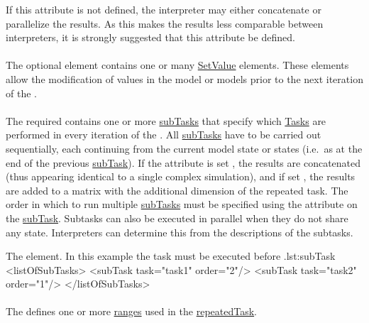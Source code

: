 If this attribute is not defined, the interpreter may either concatenate or parallelize the results.  As this makes the results less comparable between interpreters, it is strongly suggested that this attribute be defined.

\paragraph*{}
\label{sec:changesRepeatedTask}
The optional  element contains one or many \hyperref[class:setValue]{SetValue} elements. These elements allow the modification of values in the model or models prior to the next iteration of the \RepeatedTask.

\paragraph*{}
\label{class:listOfSubTasks}
The required  contains one or more \hyperref[class:subTask]{subTasks} that specify which \hyperref[class:abstractTask]{Tasks} are performed in every iteration of the \RepeatedTask. All \hyperref[class:subTask]{subTasks} have to be carried out sequentially, each continuing from the current model state or states (i.e.\ as at the end of the previous \hyperref[class:subTask]{subTask}).  If the  attribute is set , the results are concatenated (thus appearing identical to a single complex simulation), and if set , the results are added to a matrix with the additional dimension of the repeated task. The order in which to run multiple \hyperref[class:subTask]{subTasks} must be specified using the \hyperref[sec:subTaskOrder]{} attribute on the \hyperref[class:subTask]{subTask}.  Subtasks can also be executed in parallel when they do not share any state. Interpreters can determine this from the descriptions of the subtasks.

\begin{myXmlLst}{The  element. In this example the task  must be executed before .}{lst:subTask}
<listOfSubTasks>
	<subTask task="task1" order="2"/> 
	<subTask task="task2" order="1"/> 
</listOfSubTasks>
\end{myXmlLst}

\paragraph*{}
\label{class:listOfRanges}
The  defines one or more \hyperref[class:range]{ranges} used in the \hyperref[class:repeatedTask]{repeatedTask}.


